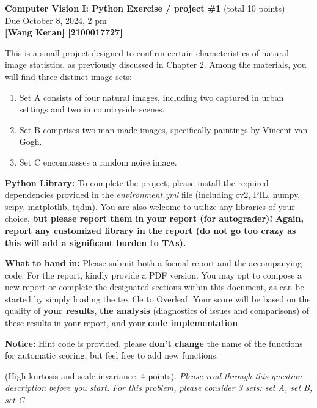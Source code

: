 \documentclass[11pt]{article}
\begin{document}
\begin{center}
{\bf Computer Vision I: Python Exercise / project \#1 } (total 10 points)\\
Due October 8, 2024, 2 pm\\

{\bf [Wang Keran] [2100017727]}
\end{center}

This is a small project designed to confirm certain characteristics of natural image statistics, as previously discussed in Chapter 2. Among the materials, you will find three distinct image sets:
\begin{enumerate}
 \item Set A consists of four natural images, including two captured in urban settings and two in countryside scenes.
 \item Set B comprises two man-made images, specifically paintings by Vincent van Gogh.
 \item Set C encompasses a random noise image.
\end{enumerate}


{\bf Python Library:} To complete the project, please install the required dependencies provided in the \textit{environment.yml} file (including cv2, PIL, numpy, scipy, matplotlib, tqdm). You are also welcome to utilize any libraries of your choice, \textbf{but please report them in your report (for autograder)!}
\color{red}
\textbf{Again, report any customized library in the report (do not go too crazy as this will add a significant burden to TAs).}
\color{black}

 {\bf What to hand in:} Please submit both a formal report and the accompanying code. For the report, kindly provide a PDF version. You may opt to compose a new report or complete the designated sections within this document, as can be started by simply loading the tex file to Overleaf. Your score will be based on the quality of \textbf{your results}, \textbf{the analysis} (diagnostics of issues and comparisons) of these results in your report, and your \textbf{code implementation}.

 {\bf Notice:} Hint code is provided, please \textbf{don't change} the name of the functions for automatic scoring, but feel free to add new functions.

\clearpage

 (High kurtosis and scale invariance, 4 points). \emph{Please read through this question description before you start.} \emph{For this problem, please consider 3 sets: set A, set B, set C.} 
\end{document}

